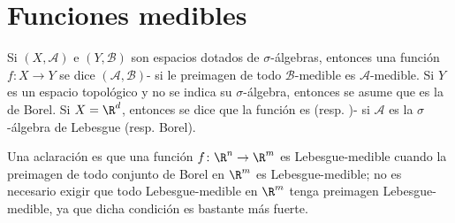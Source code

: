 \section{Funciones medibles}%
\label{sec:funciones_medibles}

\begin{mydefi}
	Si $(X, \mathcal{A})$ e $(Y, \mathcal{B})$ son espacios dotados de $\sigma$-álgebras,
	entonces una función $f\colon X\to Y$ se dice $(\mathcal{A, B})$- si le preimagen de todo $\mathcal{B}$-medible
	es $\mathcal{A}$-medible.
	Si $Y$ es un espacio topológico y no se indica su $\sigma$-álgebra, entonces se asume que es la de Borel.
	Si $X = \R^d$, entonces se dice que la función es  (resp. )- si $\mathcal{A}$ es la
	$\sigma$-álgebra de Lebesgue (resp. Borel).
\end{mydefi}
Una aclaración es que una función $f\colon \R^n \to \R^m$ es Lebesgue-medible cuando la preimagen de todo conjunto de Borel en $\R^m$ es Lebesgue-medible;
no es necesario exigir que todo Lebesgue-medible en $\R^m$ tenga preimagen Lebesgue-medible, ya que dicha condición es bastante más fuerte.


